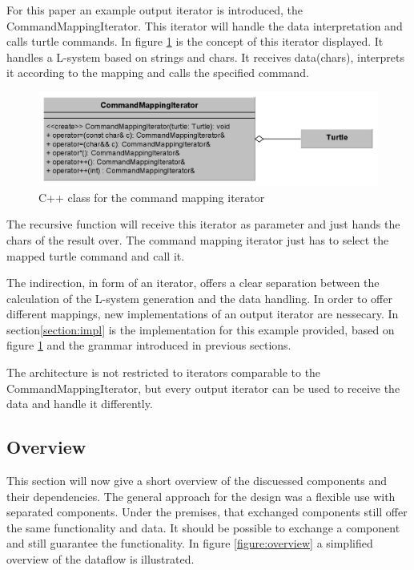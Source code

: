 \documentclass[english]{cpp-hmwk}
\begin{document}
For this paper an example output iterator is introduced, the CommandMappingIterator. This iterator will handle the data interpretation and calls turtle commands. In figure \ref{figure:if_command_map} is the concept of this iterator displayed. It handles a L-system based on strings and chars. It receives data(chars), interprets it according to the mapping and calls the specified command.

\begin{figure}[h!]
	\centering
	\includegraphics[width=1\columnwidth]{../graphs/class_command_mapping_iterator.png}
	\caption{C++ class for the command mapping iterator}
	\label{figure:if_command_map}
\end{figure}

The recursive function will receive this iterator as parameter and just hands the chars of the result over. The command mapping iterator just has to select the mapped turtle command and call it.

The indirection, in form of an iterator, offers a clear separation between the calculation of the L-system generation and the data handling. In order to offer different mappings, new implementations of an output iterator are nessecary. In section\ref{section:impl} is the implementation for this example provided, based on figure \ref{figure:if_command_map} and the grammar introduced in previous sections.

The architecture is not restricted to iterators comparable to the CommandMappingIterator, but every output iterator can be used to receive the data and handle it differently.

\subsection{Overview}
This section will now give a short overview of the discuessed components and their dependencies. The general approach for the design was a flexible use with separated components. Under the premises, that exchanged components still offer the same functionality and data.  It should be possible to exchange a component and still guarantee the functionality. In figure \ref{figure:overview} a simplified overview of the dataflow is illustrated. 
\end{document}
